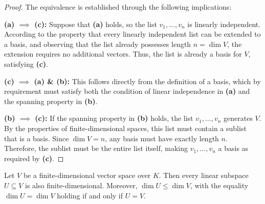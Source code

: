 \begin{proof}
The equivalence is established through the following implications:

\textbf{(a) $\implies$ (c):} Suppose that \textbf{(a)} holds, so the list $v_1, \dots, v_n$ is linearly independent. According to the property that every linearly independent list can be extended to a basis, and observing that the list already possesses length $n = \dim V$, the extension requires no additional vectors. Thus, the list is already a basis for $V$, satisfying \textbf{(c)}.

\textbf{(c) $\implies$ (a) \& (b):} This follows directly from the definition of a basis, which by requirement must satisfy both the condition of linear independence in \textbf{(a)} and the spanning property in \textbf{(b)}.

\textbf{(b) $\implies$ (c):} If the spanning property in \textbf{(b)} holds, the list $v_1, \dots, v_n$ generates $V$. By the properties of finite-dimensional spaces, this list must contain a sublist that is a basis. Since $\dim V = n$, any basis must have exactly length $n$. Therefore, the sublist must be the entire list itself, making $v_1, \dots, v_n$ a basis as required by \textbf{(c)}.
\end{proof}



\begin{proposition}
\label{prop:subspace_dimension_constraints}
Let $V$ be a finite-di\-men\-sional vector space over $K$. Then every linear subspace $U \subseteq V$ is also finite-di\-men\-sional. Moreover, $\dim U \le \dim V$, with the equality $\dim U = \dim V$ holding if and only if $U = V$.
\end{proposition}

